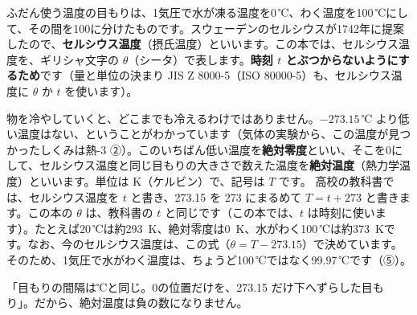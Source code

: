 \label{ph:熱-1:sec2}
ふだん使う温度の目もりは、1気圧で水が凍る温度を0\,℃、わく温度を100\,℃にして、その間を100に分けたものです。スウェーデンのセルシウスが1742年に提案したので、\textbf{セルシウス温度}（摂氏温度）といいます。この本では、セルシウス温度を、ギリシャ文字の $\theta$（シータ）で表します。\textbf{時刻 $t$ とぶつからないようにするため}です（量と単位の決まり JIS Z 8000-5（ISO 80000-5）も、セルシウス温度に $\theta$ か $t$ を使います）。

物を冷やしていくと、どこまでも冷えるわけではありません。$-273.15$\,℃ より低い温度はない、ということがわかっています（気体の実験から、この温度が見つかったしくみは熱-3 ②）。このいちばん低い温度を\textbf{絶対零度}といい、そこを0にして、セルシウス温度と同じ目もりの大きさで数えた温度を\textbf{絶対温度}（熱力学温度）といいます。単位は K（ケルビン）で、記号は $T$ です。
\label{ph:熱-1:zettai}高校の教科書では、セルシウス温度を $t$ と書き、273.15 を 273 にまるめて $T=t+273$ と書きます。この本の $\theta$ は、教科書の $t$ と同じです（この本では、$t$ は時刻に使います）。たとえば20\,℃は約\qty{293}{K}、絶対零度は\qty{0}{K}、水がわく100\,℃は約\qty{373}{K}です。なお、今のセルシウス温度は、この式（$\theta=T-273.15$）で決めています。そのため、1気圧で水がわく温度は、ちょうど100\,℃ではなく99.97\,℃です（⑤）。

\begin{phyomi}[$T=\theta+273.15$]
「目もりの間隔は℃と同じ。0の位置だけを、273.15 だけ下へずらした目もり」。だから、絶対温度は負の数になりません。
\end{phyomi}

